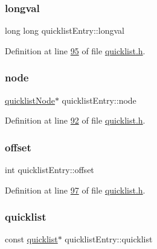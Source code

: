 \subsubsection{\texorpdfstring{longval}{longval}}
{\footnotesize\ttfamily long long quicklist\+Entry\+::longval}



Definition at line \hyperlink{quicklist_8h_source_l00095}{95} of file \hyperlink{quicklist_8h_source}{quicklist.\+h}.

\mbox{\label{structquicklistEntry_a447d03cb5ad4500cd90a4ea3f9a9f777}} 
\subsubsection{\texorpdfstring{node}{node}}
{\footnotesize\ttfamily \hyperlink{structquicklistNode}{quicklist\+Node}$\ast$ quicklist\+Entry\+::node}



Definition at line \hyperlink{quicklist_8h_source_l00092}{92} of file \hyperlink{quicklist_8h_source}{quicklist.\+h}.

\mbox{\label{structquicklistEntry_aa1f3db8120b0872295e984261aeb3d4c}} 
\subsubsection{\texorpdfstring{offset}{offset}}
{\footnotesize\ttfamily int quicklist\+Entry\+::offset}



Definition at line \hyperlink{quicklist_8h_source_l00097}{97} of file \hyperlink{quicklist_8h_source}{quicklist.\+h}.

\mbox{\label{structquicklistEntry_ae79e2864f240c77580a479632f204e5e}} 
\subsubsection{\texorpdfstring{quicklist}{quicklist}}
{\footnotesize\ttfamily const \hyperlink{structquicklist}{quicklist}$\ast$ quicklist\+Entry\+::quicklist}



